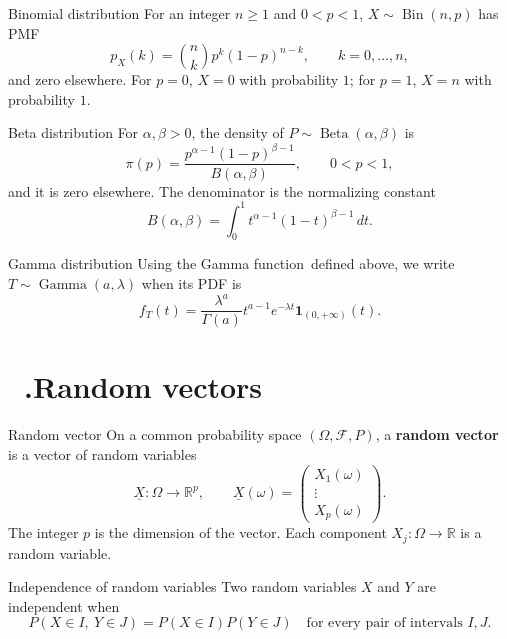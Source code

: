 \documentclass[12pt,a4paper,oneside]{report}
\newcommand{\notesheading}[1]{%
  \refstepcounter{chapter}%
  \section*{\chaptername~\thechapter.\enspace #1}}
\begin{document}
\begin{frameddefn}{Binomial distribution}
For an integer $n\geq1$ and $0<p<1$, $X\sim\operatorname{Bin}(n,p)$
has PMF
\[
  p_X(k)=\binom nk p^k(1-p)^{n-k},\qquad k=0,\ldots,n,
\]
and zero elsewhere. For $p=0$, $X=0$ with probability $1$;
for $p=1$, $X=n$ with probability $1$.
\end{frameddefn}

\begin{frameddefn}{Beta distribution}
\label{def:beta-distribution}
For $\alpha,\beta>0$, the density of
$P\sim\operatorname{Beta}(\alpha,\beta)$ is
\[
  \pi(p)=\frac{p^{\alpha-1}(1-p)^{\beta-1}}{B(\alpha,\beta)},
  \qquad 0<p<1,
\]
and it is zero elsewhere. The denominator is the normalizing
constant
\[
  B(\alpha,\beta)=\int_0^1
       t^{\alpha-1}(1-t)^{\beta-1}\,dt.
\]
\end{frameddefn}

\begingroup
\renewcommand{\thefootnote}{\fnsymbol{footnote}}
\endgroup
\nopagebreak
\begin{frameddefn}{Gamma distribution}
Using the Gamma function\begingroup\renewcommand{\thefootnote}{\fnsymbol{footnote}}\footnotemark[4]\endgroup\ defined above, we write
$T\sim\operatorname{Gamma}(a,\lambda)$ when its PDF is
\[
  f_T(t)=\frac{\lambda^a}{\Gamma(a)}
           t^{a-1}e^{-\lambda t}\mathbf1_{(0,+\infty)}(t).
\]
\end{frameddefn}

\notesheading{Random vectors}

\begin{frameddefn}{Random vector}
On a common probability space $(\Omega,\mathcal F,P)$, a
\textbf{random vector} is a vector of random variables
\[
  \underline{X}:\Omega\longrightarrow\mathbb R^p,
  \qquad
  \underline{X}(\omega)=
  \begin{pmatrix}
    X_1(\omega)\\
    \vdots\\
    X_p(\omega)
  \end{pmatrix}.
\]
The integer $p$ is the dimension of the vector. Each component
$X_j:\Omega\to\mathbb R$ is a random variable.
\end{frameddefn}

\begin{frameddefn}{Independence of random variables}
\label{def:independent-random-variables}
Two random variables $X$ and $Y$ are independent when
\[
  P(X\in I,\ Y\in J)=P(X\in I)P(Y\in J)
  \quad\text{for every pair of intervals }I,J.
\]
\end{frameddefn}
\end{document}
